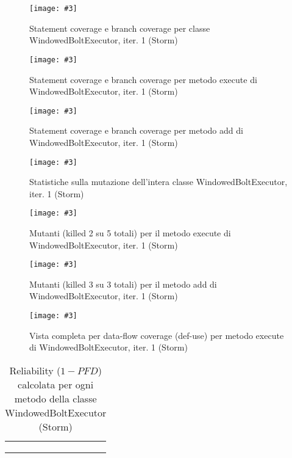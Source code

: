 \documentclass[10pt, a4paper]{article}
\newcommand{\Intmaketable}[4]{
	\begin{longtable}{#3}
	#4
	\caption{#2}
	\label{#1}
	\end{longtable}
}
\newcommand{\Intreltable}[3]{
	\Intmaketable{#1}{#2}{|l|l|l|l|l|l|l|}{
	\hline
	\thead{Metodo} & \thead{\# test totali} & \thead{\# test pass.} & \thead{\# test fail.} & \thead{Prof. op.} &
	\thead{Distribuzione} & \thead{Reliability}\\
	\hline
	\hline
	#3
	\hline}
}
\newcommand{\Intrelcaption}[2]{Reliability ($1-PFD$) calcolata per ogni metodo della classe #1 (#2)}
\newcommand{\gettablelabel}[5]{table:#1:#2:#3:iter#4:proj#5}
\newcommand{\getreltablelabel}[2]{\gettablelabel{#1}{}{}{}{#2}}
\newcommand{\reltable}[3] {
	\Intreltable{\getreltablelabel{#1}{#2}}
		{\Intrelcaption{#1}{#2}}
		{#3}
}
\newcommand{\unifdist}[1]{Uniforme: $#1$}
\newcommand{\getpicturelabel}[1]{picture:#1}
\newcommand{\makepicture}[4]{
	\begin{figure}[H]
	\centering
	\texttt{[image: \#3]}
	\caption{#4}
	\label{\getpicturelabel{#3}}
	\end{figure}
}
\newcommand{\alldfcovcaption}[4]{Vista completa per data-flow coverage (def-use) per metodo #1 di #2, iter. #3 (#4)}
\newcommand{\methodcfcovcaption}[4]{Statement coverage e branch coverage per metodo #1 di #2, iter. #3 (#4)}
\newcommand{\classcfcovcaption}[3]{Statement coverage e branch coverage per classe #1, iter. #2 (#3)}
\newcommand{\mutclasscaption}[3]{Statistiche sulla mutazione dell'intera classe #1, iter. #2 (#3)}
\newcommand{\mutmethodcaption}[6]{Mutanti (killed #5 su #6 totali) per il metodo #1 di #2, iter. #3 (#4)}
\newcommand{\tcell}{\makecell[tl]}
\newcommand{\newtrow}{\\ \hline}
\def\storm{Storm}
\begin{document}
	\makepicture{18cm}{0.75cm}{storm/controlflow-WindowedBoltExecutor-1}
				{\classcfcovcaption{WindowedBoltExecutor}{1}{\storm}}
				
	\makepicture{18cm}{0.5cm}{storm/controlflow-execute-WindowedBoltExecutor-1}
				{\methodcfcovcaption{execute}{WindowedBoltExecutor}{1}{\storm}}
				
	\makepicture{18cm}{0.5cm}{storm/controlflow-prepare-WindowedBoltExecutor-1}
				{\methodcfcovcaption{add}{WindowedBoltExecutor}{1}{\storm}}
				
	\makepicture{17cm}{1.5cm}{storm/mutation-WindowedBoltExecutor-1}
				{\mutclasscaption{WindowedBoltExecutor}{1}{\storm}}
				
	\makepicture{16.5cm}{8cm}{storm/mutation-execute-WindowedBoltExecutor-1}
				{\mutmethodcaption{execute}{WindowedBoltExecutor}{1}{\storm}{2}{5}}
	
	\makepicture{17cm}{8cm}{storm/mutation-prepare-WindowedBoltExecutor-1}
				{\mutmethodcaption{add}{WindowedBoltExecutor}{1}{\storm}{3}{3}}
				
	\makepicture{15cm}{13cm}{storm/dataflow-execute-WindowedBoltExecutor-1}
				{\alldfcovcaption{execute}{WindowedBoltExecutor}{1}{\storm}}
	
	\reltable{WindowedBoltExecutor}{\storm} {
			\tcell{prepare} &
			\tcell{$18$} &
			\tcell{$17$} &
			\tcell{$1$} &
			\tcell{
				tabella $\ref{\gettablelabel{testc}{prepare}{WindowedBoltExecutor}{1}{\storm}}$} &
			\tcell{\unifdist{0.055}} &
			\tcell{$0.945$}
		\newtrow
			\tcell{execute} &
			\tcell{$?$} &
			\tcell{$?$} &
			\tcell{$?$} &
			\tcell{
				tabella $?$} &
			\tcell{\unifdist{?}} &
			\tcell{$?$}
		\newtrow
	}
	
	
\end{document}
